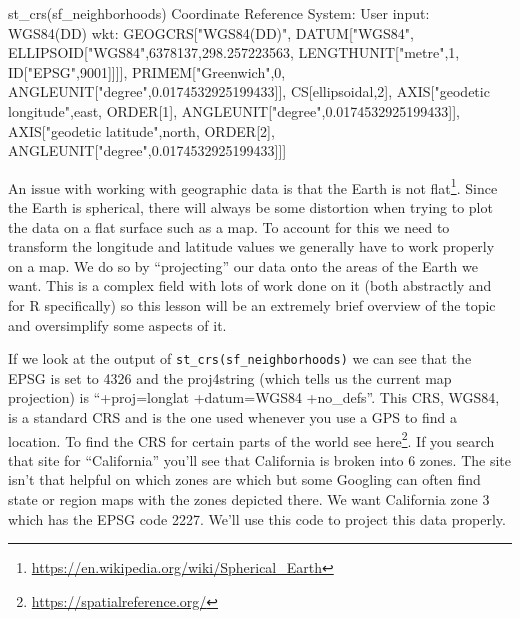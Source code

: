 \documentclass[
]{krantz}
\makeatletter
\newenvironment{Shaded}{\begin{snugshade}}{\end{snugshade}}
\newcommand{\DecValTok}[1]{\textcolor[rgb]{0.06,0.06,0.06}{#1}}
\newcommand{\FloatTok}[1]{\textcolor[rgb]{0.06,0.06,0.06}{#1}}
\newcommand{\FunctionTok}[1]{\textcolor[rgb]{0,0,0}{#1}}
\newcommand{\NormalTok}[1]{#1}
\newcommand{\SpecialCharTok}[1]{\textcolor[rgb]{0,0,0}{#1}}
\newcommand{\StringTok}[1]{\textcolor[rgb]{0.5,0.5,0.5}{#1}}
\renewcommand{\href}[2]{#2\footnote{\url{#1}}}
\newenvironment{kframe}{%
\medskip{}
\setlength{\fboxsep}{.8em}
 \def\at@end@of@kframe{}%
 \ifinner\ifhmode%
  \def\at@end@of@kframe{\end{minipage}}%
  \begin{minipage}{\columnwidth}%
 \fi\fi%
 \def\FrameCommand##1{\hskip\@totalleftmargin \hskip-\fboxsep
 \colorbox{shadecolor}{##1}\hskip-\fboxsep
     \hskip-\linewidth \hskip-\@totalleftmargin \hskip\columnwidth}%
 \MakeFramed {\advance\hsize-\width
   \@totalleftmargin\z@ \linewidth\hsize
   \@setminipage}}%
 {\par\unskip\endMakeFramed%
 \at@end@of@kframe}
\renewenvironment{Shaded}{\begin{kframe}}{\end{kframe}}
\makeatother
\begin{document}
\begin{Shaded}
\begin{Highlighting}[]
\FunctionTok{st\_crs}\NormalTok{(sf\_neighborhoods)}
\NormalTok{Coordinate Reference System}\SpecialCharTok{:}
\NormalTok{  User input}\SpecialCharTok{:} \FunctionTok{WGS84}\NormalTok{(DD) }
\NormalTok{  wkt}\SpecialCharTok{:}
\NormalTok{GEOGCRS[}\StringTok{"WGS84(DD)"}\NormalTok{,}
\NormalTok{    DATUM[}\StringTok{"WGS84"}\NormalTok{,}
\NormalTok{        ELLIPSOID[}\StringTok{"WGS84"}\NormalTok{,}\DecValTok{6378137}\NormalTok{,}\FloatTok{298.257223563}\NormalTok{,}
\NormalTok{            LENGTHUNIT[}\StringTok{"metre"}\NormalTok{,}\DecValTok{1}\NormalTok{,}
\NormalTok{                ID[}\StringTok{"EPSG"}\NormalTok{,}\DecValTok{9001}\NormalTok{]]]],}
\NormalTok{    PRIMEM[}\StringTok{"Greenwich"}\NormalTok{,}\DecValTok{0}\NormalTok{,}
\NormalTok{        ANGLEUNIT[}\StringTok{"degree"}\NormalTok{,}\FloatTok{0.0174532925199433}\NormalTok{]],}
\NormalTok{    CS[ellipsoidal,}\DecValTok{2}\NormalTok{],}
\NormalTok{        AXIS[}\StringTok{"geodetic longitude"}\NormalTok{,east,}
\NormalTok{            ORDER[}\DecValTok{1}\NormalTok{],}
\NormalTok{            ANGLEUNIT[}\StringTok{"degree"}\NormalTok{,}\FloatTok{0.0174532925199433}\NormalTok{]],}
\NormalTok{        AXIS[}\StringTok{"geodetic latitude"}\NormalTok{,north,}
\NormalTok{            ORDER[}\DecValTok{2}\NormalTok{],}
\NormalTok{            ANGLEUNIT[}\StringTok{"degree"}\NormalTok{,}\FloatTok{0.0174532925199433}\NormalTok{]]]}
\end{Highlighting}
\end{Shaded}

An issue with working with geographic data is that \href{https://en.wikipedia.org/wiki/Spherical_Earth}{the Earth is not flat}. Since the Earth is spherical, there will always be some distortion when trying to plot the data on a flat surface such as a map. To account for this we need to transform the longitude and latitude values we generally have to work properly on a map. We do so by ``projecting'' our data onto the areas of the Earth we want. This is a complex field with lots of work done on it (both abstractly and for R specifically) so this lesson will be an extremely brief overview of the topic and oversimplify some aspects of it.

If we look at the output of \texttt{st\_crs(sf\_neighborhoods)} we can see that the EPSG is set to 4326 and the proj4string (which tells us the current map projection) is ``+proj=longlat +datum=WGS84 +no\_defs''. This CRS, WGS84, is a standard CRS and is the one used whenever you use a GPS to find a location. To find the CRS for certain parts of the world see \href{https://spatialreference.org/}{here}. If you search that site for ``California'' you'll see that California is broken into 6 zones. The site isn't that helpful on which zones are which but some Googling can often find state or region maps with the zones depicted there. We want California zone 3 which has the EPSG code 2227. We'll use this code to project this data properly.
\end{document}

